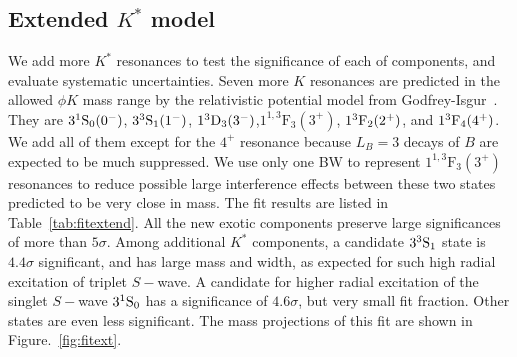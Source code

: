 \subsection{Extended $K^*$ model}
We add more $K^*$ resonances to test the significance of each of components, 
and evaluate systematic uncertainties. 
Seven more $K$ resonances are predicted in the allowed $\phi K$ mass range by the relativistic potential model from Godfrey-Isgur~\supercite{Godfrey:1985xj}. 
They are $3{}^{1}{\rm S}_{0}(0^-)$, $3{}^{3}{\rm S}_{1}(1^-)$, $1{}^{3}{\rm D}_{3}(3^-)$,$1^{1,3}\mathrm{F}_3(3^+)$, $1{}^{3}{\rm F}_{2}(2^+)$, and $1{}^{3}{\rm F}_{4}(4^+)$. 
We add all of them except for the $4^+$ resonance because $L_{B}=3$ decays of $B$ are expected to be much suppressed. 
We use only one BW to represent $1^{1,3}\mathrm{F}_3(3^+)$ resonances to reduce possible large interference effects between these two states predicted to be very close in mass. 
The fit results are listed in Table~\ref{tab:fitextend}. 
All the new exotic components preserve large significances of more than $5\sigma$.  
Among additional $K^*$ components, 
a candidate $3{}^{3}{\rm S}_{1}$ state is $4.4\sigma$ significant, 
and has large mass and width, 
as expected for such high radial excitation of triplet $S-$wave. 
A candidate for higher radial excitation of the singlet $S-$wave $3{}^{1}{\rm S}_{0}$ has a significance of $4.6\sigma$, 
but very small fit fraction.
Other states are even less significant. 
The mass projections of this fit are shown in Figure.~\ref{fig:fitext}.

